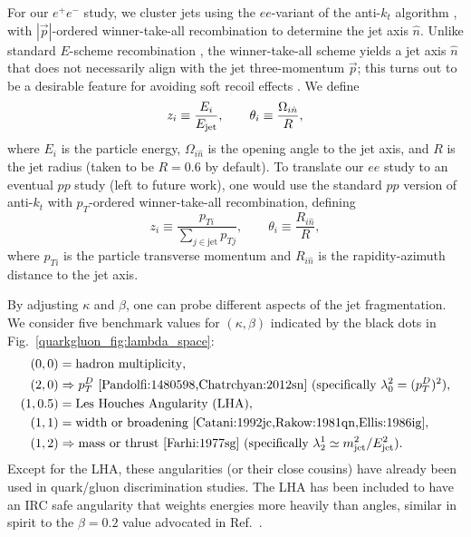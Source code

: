 \documentclass[11pt]{cernrep}
\begin{document}
For our $e^+ e^-$ study, we cluster jets using the $ee$-variant of the
anti-$k_t$ algorithm \cite{Cacciari:2008gp}, with $|\vec{p}|$-ordered
winner-take-all recombination
\cite{Larkoski:2014uqa,Bertolini:2013iqa,Salam:WTAUnpublished} to
determine the jet axis $\hat{n}$.  Unlike standard $E$-scheme
recombination \cite{Blazey:2000qt}, the winner-take-all scheme yields
a jet axis $\hat{n}$ that does not necessarily align with the jet
three-momentum $\vec{p}$; this turns out to be a desirable feature
for avoiding soft recoil effects
\cite{Larkoski:2013eya,Larkoski:2014uqa,Catani:1992jc,Dokshitzer:1998kz,Banfi:2004yd}.  We define
\begin{equation}
z_i \equiv \frac{E_i}{E_{\rm jet}}, \qquad \theta_i \equiv \frac{\Omega_{i \hat{n}}}{R},
\end{equation}
where $E_i$ is the particle energy, $\Omega_{i \hat{n}}$ is the opening angle to the jet axis, and $R$ is the jet radius (taken to be $R = 0.6$ by default).  To translate our $ee$ study to an eventual $pp$ study (left to future work), one would use the standard $pp$ version of anti-$k_t$ with $p_T$-ordered winner-take-all recombination, defining
\begin{equation}
z_i \equiv \frac{p_{Ti}}{\sum_{j \in \text{jet}} p_{Tj}}, \qquad \theta_i \equiv \frac{R_{i \hat{n}}}{R},
\end{equation}
where $p_{Ti}$ is the particle transverse momentum and $R_{i \hat{n}}$ is the rapidity-azimuth distance to the jet axis.



By adjusting $\kappa$ and $\beta$, one can probe different aspects of the jet fragmentation.  We consider five benchmark values for $(\kappa, \beta)$ indicated by the black dots in Fig.~\ref{quarkgluon_fig:lambda_space}:
\begin{equation}
\label{quarkgluon_eq:benchmarkang}
\begin{aligned}
(0,0) &= \text{hadron multiplicity},\\
(2,0) &\Rightarrow p_T^D \text{  \cite{Pandolfi:1480598,Chatrchyan:2012sn} (specifically $\lambda^{2}_{0} = (p_T^D)^2$)},\\
(1,0.5) & = \text{Les Houches Angularity (LHA)},\\
(1,1) &= \text{width or broadening \cite{Catani:1992jc,Rakow:1981qn,Ellis:1986ig}},\\
(1,2) & \Rightarrow \text{mass or thrust \cite{Farhi:1977sg}
  (specifically $\lambda^{1}_{2} \simeq m_{\rm jet}^2 / E_{\rm
    jet}^2$)}.
\end{aligned}
\end{equation}
Except for the LHA, these angularities (or their close cousins) have already been used in quark/gluon discrimination studies.  The LHA has been included to have an IRC safe angularity that weights energies more heavily than angles, similar in spirit to the $\beta = 0.2$ value advocated in Ref.~\cite{Larkoski:2013eya}.
\end{document}
